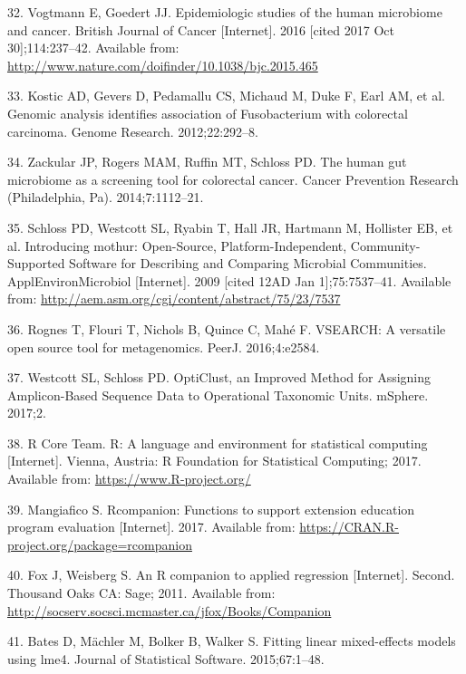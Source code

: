 \documentclass[12pt,]{article}
\begin{document}
\hypertarget{ref-vogtmann_epidemiologic_2016}{}
32. Vogtmann E, Goedert JJ. Epidemiologic studies of the human
microbiome and cancer. British Journal of Cancer {[}Internet{]}. 2016
{[}cited 2017 Oct 30{]};114:237--42. Available from:
\url{http://www.nature.com/doifinder/10.1038/bjc.2015.465}

\hypertarget{ref-kostic_genomic_2012}{}
33. Kostic AD, Gevers D, Pedamallu CS, Michaud M, Duke F, Earl AM, et
al. Genomic analysis identifies association of Fusobacterium with
colorectal carcinoma. Genome Research. 2012;22:292--8.

\hypertarget{ref-zackular_human_2014}{}
34. Zackular JP, Rogers MAM, Ruffin MT, Schloss PD. The human gut
microbiome as a screening tool for colorectal cancer. Cancer Prevention
Research (Philadelphia, Pa). 2014;7:1112--21.

\hypertarget{ref-schloss_introducing_2009}{}
35. Schloss PD, Westcott SL, Ryabin T, Hall JR, Hartmann M, Hollister
EB, et al. Introducing mothur: Open-Source, Platform-Independent,
Community-Supported Software for Describing and Comparing Microbial
Communities. ApplEnvironMicrobiol {[}Internet{]}. 2009 {[}cited 12AD Jan
1{]};75:7537--41. Available from:
\url{http://aem.asm.org/cgi/content/abstract/75/23/7537}

\hypertarget{ref-rognes_vsearch_2016}{}
36. Rognes T, Flouri T, Nichols B, Quince C, Mahé F. VSEARCH: A
versatile open source tool for metagenomics. PeerJ. 2016;4:e2584.

\hypertarget{ref-westcott_opticlust_2017}{}
37. Westcott SL, Schloss PD. OptiClust, an Improved Method for Assigning
Amplicon-Based Sequence Data to Operational Taxonomic Units. mSphere.
2017;2.

\hypertarget{ref-r_citation_2017}{}
38. R Core Team. R: A language and environment for statistical computing
{[}Internet{]}. Vienna, Austria: R Foundation for Statistical Computing;
2017. Available from: \url{https://www.R-project.org/}

\hypertarget{ref-rcompanion_citation_2017}{}
39. Mangiafico S. Rcompanion: Functions to support extension education
program evaluation {[}Internet{]}. 2017. Available from:
\url{https://CRAN.R-project.org/package=rcompanion}

\hypertarget{ref-car_citation_2011}{}
40. Fox J, Weisberg S. An R companion to applied regression
{[}Internet{]}. Second. Thousand Oaks CA: Sage; 2011. Available from:
\url{http://socserv.socsci.mcmaster.ca/jfox/Books/Companion}

\hypertarget{ref-lme4_citation_2015}{}
41. Bates D, Mächler M, Bolker B, Walker S. Fitting linear mixed-effects
models using lme4. Journal of Statistical Software. 2015;67:1--48.
\end{document}
